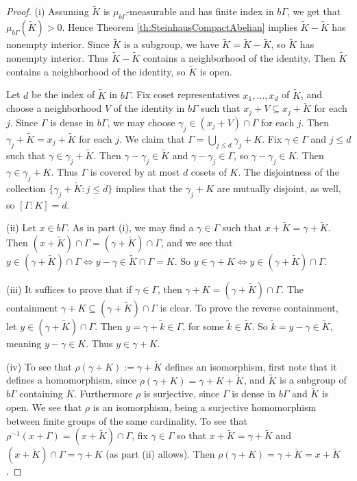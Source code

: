 \documentclass[12pt]{amsart} \usepackage{amsmath,centernot,amssymb,leftindex}
\numberwithin{theorem}{section}
\numberwithin{equation}{section}
\theoremstyle{definition}
\begin{document}
	
	\begin{proof}
(i) Assuming $\tilde{K}$ is $\mu_{b\Gamma}$-measurable and has finite index in $b\Gamma$, we get that $\mu_{b\Gamma}(\tilde{K})>0$.  Hence Theorem \ref{th:SteinhausCompactAbelian} implies $\tilde{K}-\tilde{K}$ has nonempty interior.  Since $\tilde{K}$ is a subgroup, we have $\tilde{K}=\tilde{K}-\tilde{K}$, so $\tilde{K}$ has nonempty interior. Thus $\tilde{K}-\tilde{K}$ contains a neighborhood of the identity.  Then $\tilde{K}$ contains a neighborhood of the identity, so $\tilde{K}$ is open.

Let $d$ be the index of $\tilde{K}$ in $b\Gamma$. Fix coset representatives $x_{1},\dots,x_{d}$ of $\tilde{K}$, and choose a neighborhood $V$ of the identity in $b\Gamma$ such that $x_{j}+V\subseteq x_{j}+\tilde{K}$ for each $j$.  Since $\Gamma$ is dense in $b\Gamma$, we may choose $\gamma_{j}\in (x_{j}+V)\cap \Gamma$ for each $j$.  Then $\gamma_{j}+\tilde{K}=x_{j}+\tilde{K}$ for each $j$.  We claim that $\Gamma = \bigcup_{j\leq d} \gamma_{j} + K.$  Fix $\gamma\in \Gamma$ and $j\leq d$ such that $\gamma \in \gamma_{j}+\tilde{K}$.  Then $\gamma-\gamma_{j}\in \tilde{K}$ and $\gamma-\gamma_{j}\in \Gamma$, so $\gamma-\gamma_{j}\in K$.  Then $\gamma\in \gamma_{j}+K$.  Thus $\Gamma$ is covered by at most $d$ cosets of $K$.  The disjointness of the collection $\{\gamma_{j}+\tilde{K}:j\leq d\}$ implies that the $\gamma_{j}+K$ are mutually disjoint, as well, so $[\Gamma:K]=d$.


(ii) Let $x\in b\Gamma$.  As in part (i), we may find a $\gamma\in \Gamma$ such that $x+\tilde{K}=\gamma+\tilde{K}$.  Then $(x+\tilde{K})\cap \Gamma = (\gamma+ \tilde{K})\cap \Gamma$, and we see that $y\in (\gamma+\tilde{K})\cap \Gamma \iff y-\gamma \in \tilde{K}\cap \Gamma=K$.  So $y\in \gamma+K \iff y\in (\gamma +\tilde{K})\cap \Gamma$.

(iii) It suffices to prove that if $\gamma\in \Gamma$, then $\gamma+K=(\gamma+\tilde{K})\cap \Gamma$.  The containment $\gamma+K\subseteq (\gamma+\tilde{K})\cap \Gamma$ is clear. To prove the reverse containment, let $y\in (\gamma+\tilde{K})\cap \Gamma$.  Then $y=\gamma + \tilde{k} \in \Gamma$, for some $\tilde{k}\in \tilde{K}$.  So $\tilde{k} = y-\gamma \in \tilde{K}$, meaning $y-\gamma \in K$.  Thus $y\in \gamma + K$.

(iv) To see that $\rho(\gamma+K):=\gamma+\tilde{K}$ defines an isomorphism, first note that it defines a homomorphism, since $\rho(\gamma+K)=\gamma+K+\tilde{K}$, and $\tilde{K}$ is a subgroup of $b\Gamma$ containing $K$.  Furthermore $\rho$ is surjective, since $\Gamma$ is dense in $b\Gamma$ and $\tilde{K}$ is open.  We see that $\rho$ is an isomorphism, being a surjective homomorphism between finite groups of the same cardinality.  To see that $\rho^{-1}(x+\Gamma)=(x+\tilde{K})\cap \Gamma$, fix $\gamma\in \Gamma$ so that $x+\tilde{K}=\gamma+\tilde{K}$ and $(x+\tilde{K})\cap \Gamma= \gamma +K$ (as part (ii) allows). Then $\rho(\gamma+K)= \gamma+\tilde{K}= x+\tilde{K}$.



\end{proof}
\end{document}
